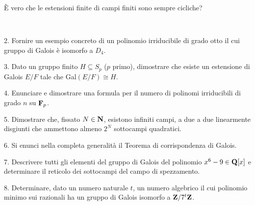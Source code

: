 \`E vero che le estensioni finite di campi finiti sono sempre cicliche?\medskip\bigskip\bigskip

\ \dotfill\ \bigskip\bigskip\bigskip


\vfil\eject


\item{2.} Fornire un esempio concreto di un polinomio irriducibile di grado otto il cui gruppo di Galois \`e isomorfo a $D_4$.\vv


\item{3.} Dato un gruppo finito $H\subseteq S_p$ ($p$ primo), dimostrare che esiste un estensione di Galois $E/F$ tale che 
Gal$(E/F)\cong H$.
\ve\ \vs


\item{4.} Enunciare e dimostrare una formula per il numero di polinomi irriducibili di grado $n$ su ${\bf F}_p$. 

\vv

\item{5.} Dimostrare che, fissato $N\in{\bf N}$, esistono infiniti campi, a due a due linearmente disgiunti che 
ammettono almeno $2^N$ sottocampi quadratici.
\ve\ \vs


\item{6.} Si enunci nella completa generalit\`a il Teorema di
corrispondenza di Galois.\vskip7cm\vv\vv


\item{7.} Descrivere tutti gli elementi del gruppo di Galois del polinomio $x^6-9\in{\bf Q}[x]$ e determinare il reticolo dei sottocampi
del campo di spezzamento.\vskip7cm\vv\vv

\item{8.} Determinare, dato un numero naturale $t$, un numero algebrico il cui polinomio minimo sui razionali ha un gruppo di 
Galois isomorfo a ${\bf Z}/{7^{t}}{\bf Z}$.

\vv



\ \vst
 \bye
